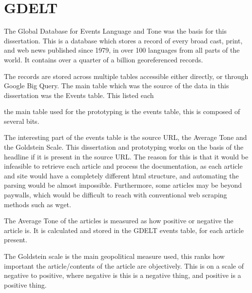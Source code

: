\section{GDELT}

The Global Database for Events Language and Tone was the basis for this dissertation. This is a database which stores a record of every broad cast, print, and web news published since 1979, in over 100 languages from all parts of the world. It contains over a quarter of a billion georeferenced records. 

The records are stored across multiple tables accessible either directly, or through Google Big Query. The main table which was the source of the data in this dissertation was the Events table. This listed each 

the main table used for the prototyping is the events table, this is composed of several bits. 

The interesting part of the events table is the source URL, the Average Tone and the Goldstein Scale. This dissertation and prototyping works on the basis of the headline if it is present in the source URL. The reason for this is that it would be infeasible to retrieve each article and process the documentation, as each article and site would have a completely different html structure, and automating the parsing would be almost impossible. Furthermore, some articles may be beyond paywalls, which would be difficult to reach with conventional web scraping methods such as wget.

The Average Tone of the articles is measured as how positive or negative the article is. It is calculated and stored in the GDELT events table, for each article present.

The Goldstein scale is the main geopolitical measure used, this ranks how important the article/contents of the article are objectively. This is on a scale of negative to positive, where negative is this is a negative thing, and positive is a positive thing.